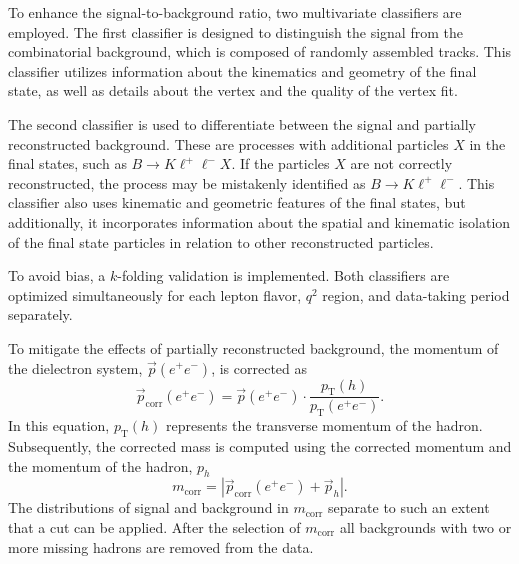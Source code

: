To enhance the signal-to-background ratio, two multivariate classifiers are employed. The 
first classifier is designed to distinguish the signal from the combinatorial background, 
which is composed of randomly assembled tracks. This classifier utilizes information about 
the kinematics and geometry of the final state, as well as details about the vertex and the 
quality of the vertex fit.

The second classifier is used to differentiate between the signal and partially reconstructed 
background. These are processes with additional particles $X$ in the final states, such as 
$B\to K \ell^+\ell^- X$. If the particles $X$ are not correctly reconstructed, the process may be mistakenly 
identified as $B \to K \ell^+\ell^-$. This classifier also uses kinematic and geometric features of 
the final states, but additionally, it incorporates information about the spatial and kinematic 
isolation of the final state particles in relation to other reconstructed particles.

To avoid bias, a $k$-folding validation is implemented. Both classifiers are optimized 
simultaneously for each lepton flavor, $q^2$ region, and data-taking period separately.

To mitigate the effects of partially reconstructed background, the momentum of the 
dielectron system, $\vec{p}(e^+e^-)$, is corrected as
\begin{equation}
    \vec{p}_\text{corr}(e^+e^-)=\vec{p}(e^+e^-)\cdot\frac{p_\text{T}(h)}{p_\text{T}(e^+e^-)}.
\end{equation}
In this equation, $p_\text{T}(h)$ represents the transverse momentum of the hadron. 
Subsequently, the corrected mass is computed using the corrected momentum and the 
momentum of the hadron, $p_h$
\begin{equation}
    m_\text{corr}=|\vec{p}_\text{corr}(e^+e^-)+\vec{p}_h|.
\end{equation}
The distributions of signal and background in $m_\text{corr}$ separate to such an extent 
that a cut can be applied. After the selection of $m_\text{corr}$ all backgrounds with two 
or more missing hadrons are removed from the data.

